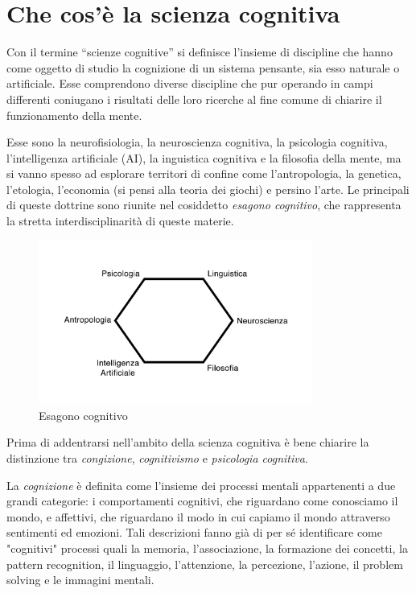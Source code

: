 \chapter{Che cos'è la scienza cognitiva}
Con il termine ``scienze cognitive'' si definisce l'insieme di discipline che hanno come oggetto di studio la cognizione di un sistema pensante, sia esso naturale o artificiale. Esse comprendono diverse discipline che pur operando in campi differenti coniugano i risultati delle loro ricerche al fine comune di chiarire il funzionamento della mente.

Esse sono la neurofisiologia, la neuroscienza cognitiva, la psicologia cognitiva, l'intelligenza artificiale (AI), la inguistica cognitiva e la filosofia della mente, ma si vanno spesso ad esplorare territori di confine come l'antropologia, la genetica, l'etologia, l'economia (si pensi alla teoria dei giochi) e persino l'arte. Le principali di queste dottrine sono riunite nel cosiddetto \emph{esagono cognitivo}, che rappresenta la stretta interdisciplinarità di queste materie.

\begin{figure}[hbt]
  \centering
  \includegraphics[width=0.8\textwidth]{img/esagonocognitivo.jpg}
  \caption{Esagono cognitivo}
\end{figure}

Prima di addentrarsi nell'ambito della scienza cognitiva è bene chiarire la distinzione tra \emph{congizione}, \emph{cognitivismo} e \emph{psicologia cognitiva}.

La \emph{cognizione} è definita come l'insieme dei processi mentali appartenenti a due grandi categorie: i comportamenti cognitivi, che riguardano come conosciamo il mondo, e affettivi, che riguardano il modo in cui capiamo il mondo attraverso sentimenti ed emozioni. Tali descrizioni fanno già di per sé identificare come "cognitivi" processi quali la memoria, l'associazione, la formazione dei concetti, la pattern recognition, il linguaggio, l'attenzione, la percezione, l'azione, il problem solving e le immagini mentali.

